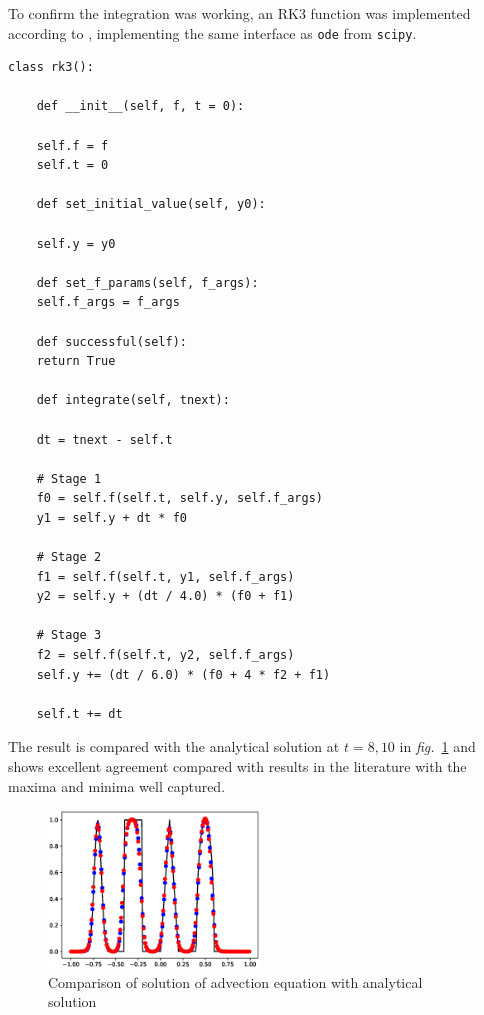 \documentclass[11pt]{article}
\begin{document}
To confirm the integration was working, an RK3 function was implemented according to \cite{Croce2004},
implementing the same interface as \texttt{ode} from \texttt{scipy}.

\begin{lstlisting}
class rk3():

    def __init__(self, f, t = 0):

	self.f = f
	self.t = 0

    def set_initial_value(self, y0):

	self.y = y0

    def set_f_params(self, f_args):
	self.f_args = f_args

    def successful(self):
	return True

    def integrate(self, tnext):

	dt = tnext - self.t

	# Stage 1
	f0 = self.f(self.t, self.y, self.f_args)
	y1 = self.y + dt * f0

	# Stage 2
	f1 = self.f(self.t, y1, self.f_args)
	y2 = self.y + (dt / 4.0) * (f0 + f1)

	# Stage 3
	f2 = self.f(self.t, y2, self.f_args)
	self.y += (dt / 6.0) * (f0 + 4 * f2 + f1)

	self.t += dt
\end{lstlisting}

The result is compared with the analytical solution at \(t=8, 10\) in \emph{fig.}~\ref{fig:org963ffb9} and shows
excellent agreement compared with results in the literature \cite{Jiang1996} with the maxima and
minima well captured.

\begin{figure}[htbp]
\centering
\includegraphics[width=0.5\textwidth]{./adv_test.eps}
\caption{\label{fig:org963ffb9}
Comparison of solution of advection equation with analytical solution}
\end{figure}
\end{document}
